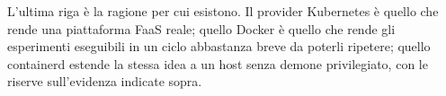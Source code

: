 L'ultima riga \`e la ragione per cui esistono. Il provider Kubernetes
\`e quello che rende \nf{} una piattaforma FaaS reale; quello Docker \`e quello
che rende gli esperimenti eseguibili in un ciclo abbastanza breve da poterli
ripetere; quello containerd estende la stessa idea a un host senza demone
privilegiato, con le riserve sull'evidenza indicate sopra.
